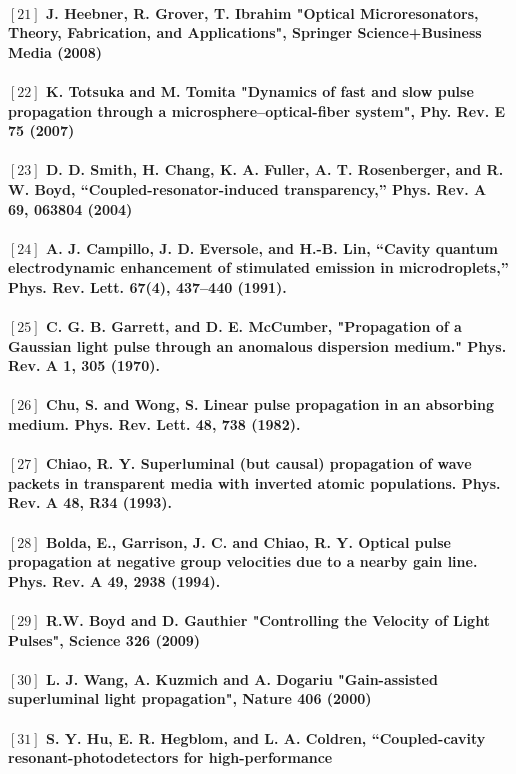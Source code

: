 \paragraph{\normalfont \large $[21]$ J. Heebner, R. Grover, T. Ibrahim "Optical Microresonators, Theory, Fabrication, and Applications", Springer Science+Business Media (2008)\\
\\ $[22]$ K. Totsuka and M. Tomita "Dynamics of fast and slow pulse propagation through a microsphere–optical-fiber system", Phy. Rev. E \textbf{75} (2007)\\
\\ $[23]$ D. D. Smith, H. Chang, K. A. Fuller, A. T. Rosenberger, and R. W. Boyd, “Coupled-resonator-induced
transparency,” Phys. Rev. A \textbf{69}, 063804 (2004)\\
\\ $[24]$ A. J. Campillo, J. D. Eversole, and H.-B. Lin, “Cavity quantum electrodynamic enhancement of stimulated
emission in microdroplets,” Phys. Rev. Lett. \textbf{67}(4), 437–440 (1991).\\
\\ $[25]$ C. G. B. Garrett, and D. E. McCumber,  "Propagation of a Gaussian light pulse through an anomalous dispersion medium." Phys. Rev. A \textbf{1}, 305 (1970).\\
\\ $[26]$ Chu, S. and Wong, S. Linear pulse propagation in an absorbing medium. Phys. Rev. Lett. \textbf{48}, 738
(1982).\\
\\ $[27]$ Chiao, R. Y. Superluminal (but causal) propagation of wave packets in transparent media with inverted atomic populations. Phys. Rev. A \textbf{48}, R34 (1993).\\
\\ $[28]$ Bolda, E., Garrison, J. C. and Chiao, R. Y. Optical pulse propagation at negative group velocities due to a nearby gain line. Phys. Rev. A \textbf{49}, 2938 (1994).\\
\\ $[29]$ R.W. Boyd and D. Gauthier "Controlling the Velocity of Light Pulses", Science \textbf{326} (2009)\\
\\ $[30]$ L. J. Wang, A. Kuzmich and A. Dogariu "Gain-assisted superluminal light propagation", Nature \textbf{406} (2000)\\
\\ $[31]$  S. Y. Hu, E. R. Hegblom, and L. A. Coldren, “Coupled-cavity resonant-photodetectors for high-performance
}
